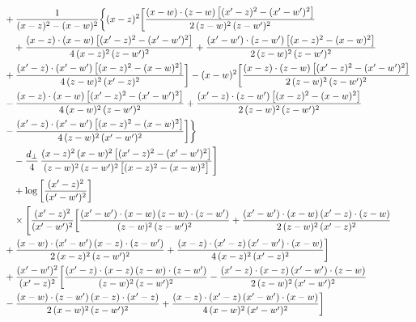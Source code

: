 \documentclass[9pt]{article}
\numberwithin{equation}{section}
\begin{document}
\begin{align}
&+\frac{1}{(x-z)^{2}-(x-w)^{2}}\bigg\{(x-z)^{2}\bigg[\frac{(x-w)\cdot(z-w)\,\big[(x^{\prime}-z)^{2}-(x^{\prime}-w^{\prime})^{2}\big]}{2\,(z-w)^{2}\,(z-w^{\prime})^{2}}\notag\\
&\quad +\frac{(x-z)\cdot(x-w)\,\big[(x^{\prime}-z)^{2}-(x^{\prime}-w^{\prime})^{2}\big]}{4\,(x-z)^{2}\,(z-w^{\prime})^{2}}+\frac{(x^{\prime}-w^{\prime})\cdot(z-w^{\prime})\,\big[(x-z)^{2}-(x-w)^{2}\big]}{2\,(z-w)^{2}\,(z-w^{\prime})^{2}}\notag \\ & +\frac{(x^{\prime}-z)\cdot(x^{\prime}-w^{\prime})\,\big[(x-z)^{2}-(x-w)^{2}\big]}{4\,(z-w)^{2}\,(x^{\prime}-z)^{2}}\bigg]-(x-w)^{2}\bigg[\frac{(x-z)\cdot(z-w)\,\big[(x^{\prime}-z)^{2}-(x^{\prime}-w^{\prime})^{2}\big]}{2\,(z-w)^{2}\,(z-w^{\prime})^{2}}\notag \\ & -\frac{(x-z)\cdot(x-w)\,\big[(x^{\prime}-z)^{2}-(x^{\prime}-w^{\prime})^{2}\big]}{4\,(x-w)^{2}\,(z-w^{\prime})^{2}}+\frac{(x^{\prime}-z)\cdot(z-w^{\prime})\,\big[(x-z)^{2}-(x-w)^{2}\big]}{2\,(z-w)^{2}\,(z-w^{\prime})^{2}}\notag \\ & -\frac{(x^{\prime}-z)\cdot(x^{\prime}-w^{\prime})\,\big[(x-z)^{2}-(x-w)^{2}\big]}{4\,(z-w)^{2}\,(x^{\prime}-w^{\prime})^{2}}\bigg]\bigg\}\notag\\
&\quad -\frac{d_{\perp}}{4}\,\frac{(x-z)^{2}\,(x-w)^{2}\,\big[(x^{\prime}-z)^{2}-(x^{\prime}-w^{\prime})^{2}\big]}{(z-w)^{2}\,(z-w^{\prime})^{2}\,\big[(x-z)^{2}-(x-w)^{2}\big]}\Bigg]\notag\\&\quad+\log\left[\frac{(x^{\prime}-z)^{2}}{(x^{\prime}-w^{\prime})^{2}}\right]\notag\\&\quad\times\Bigg[\frac{(x^{\prime}-z)^{2}}{(x^{\prime}-w^{\prime})^{2}}\bigg[\frac{(x^{\prime}-w^{\prime})\cdot(x-w)\,(z-w)\cdot(z-w^{\prime})}{(z-w)^{2}\,(z-w^{\prime})^{2}}+\frac{(x^{\prime}-w^{\prime})\cdot(x-w)\,(x^{\prime}-z)\cdot(z-w)}{2\,(z-w)^{2}\,(x^{\prime}-z)^{2}}\notag \\ & +\frac{(x-w)\cdot(x^{\prime}-w^{\prime})\,(x-z)\cdot(z-w^{\prime})}{2\,(x-z)^{2}\,(z-w^{\prime})^{2}}+\frac{(x-z)\cdot(x^{\prime}-z)\,(x^{\prime}-w^{\prime})\cdot(x-w)}{4\,(x-z)^{2}\,(x^{\prime}-z)^{2}}\bigg]\notag\\
&+\frac{(x^{\prime}-w^{\prime})^{2}}{(x^{\prime}-z)^{2}}\bigg[\frac{(x^{\prime}-z)\cdot(x-z)\,(z-w)\cdot(z-w^{\prime})}{(z-w)^{2}\,(z-w^{\prime})^{2}}-\frac{(x^{\prime}-z)\cdot(x-z)\,(x^{\prime}-w^{\prime})\cdot(z-w)}{2\,(z-w)^{2}\,(x^{\prime}-w^{\prime})^{2}}\notag \\ & -\frac{(x-w)\cdot(z-w^{\prime})\,(x-z)\cdot(x^{\prime}-z)}{2\,(x-w)^{2}\,(z-w^{\prime})^{2}}+\frac{(x-z)\cdot(x^{\prime}-z)\,(x^{\prime}-w^{\prime})\cdot(x-w)}{4\,(x-w)^{2}\,(x^{\prime}-w^{\prime})^{2}}\bigg]\notag\\

\end{align}
\end{document}
